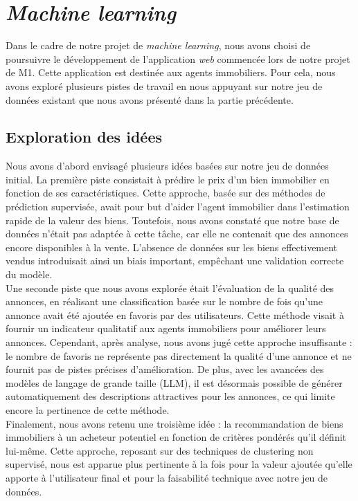 \documentclass[a4paper, 12pt, twoside]{report}
\begin{document}
\chapter{\textit{Machine learning}}
	
Dans le cadre de notre projet de {\it machine learning}, nous avons choisi de poursuivre le développement de l'application {\it web} commencée lors de notre projet de M1. Cette application est destinée aux agents immobiliers. Pour cela, nous avons exploré plusieurs pistes de travail en nous appuyant sur notre jeu de données existant que nous avons présenté dans la partie précédente.

	\section{Exploration des idées}
	
	Nous avons d'abord envisagé plusieurs idées basées sur notre jeu de données initial. La première piste consistait à prédire le prix d'un bien immobilier en fonction de ses caractéristiques. Cette approche, basée sur des méthodes de prédiction supervisée, avait pour but d'aider l'agent immobilier dans l'estimation rapide de la valeur des biens. Toutefois, nous avons constaté que notre base de données n'était pas adaptée à cette tâche, car elle ne contenait que des annonces encore disponibles à la vente. L'absence de données sur les biens effectivement vendus introduisait ainsi un biais important, empêchant une validation correcte du modèle. \\

	Une seconde piste que nous avons explorée était l’évaluation de la qualité des annonces, en réalisant une classification basée sur le nombre de fois qu'une annonce avait été ajoutée en favoris par des utilisateurs. Cette méthode visait à fournir un indicateur qualitatif aux agents immobiliers pour améliorer leurs annonces. Cependant, après analyse, nous avons jugé cette approche insuffisante : le nombre de favoris ne représente pas directement la qualité d’une annonce et ne fournit pas de pistes précises d'amélioration. De plus, avec les avancées des modèles de langage de grande taille (LLM), il est désormais possible de générer automatiquement des descriptions attractives pour les annonces, ce qui limite encore la pertinence de cette méthode. \\
	
	Finalement, nous avons retenu une troisième idée : la recommandation de biens immobiliers à un acheteur potentiel en fonction de critères pondérés qu’il définit lui-même. Cette approche, reposant sur des techniques de clustering non supervisé, nous est apparue plus pertinente à la fois pour la valeur ajoutée qu’elle apporte à l’utilisateur final et pour la faisabilité technique avec notre jeu de données.
\end{document}
